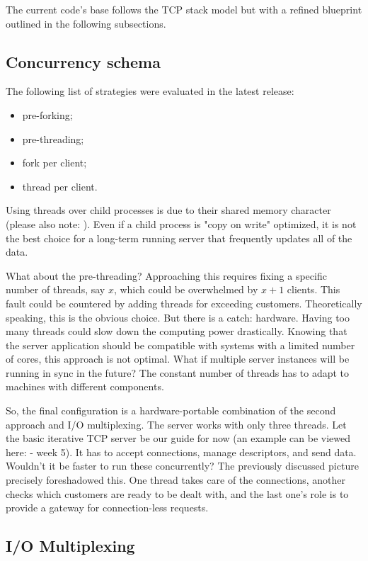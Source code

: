 \documentclass[runningheads]{llncs}
\begin{document}
The current code's base follows the TCP stack model but with a refined blueprint outlined in the following subsections.

\subsection{Concurrency schema}

The following list of strategies were evaluated in the latest release:
\begin{itemize}
  \item pre-forking;
  \item pre-threading;
  \item fork per client;
  \item thread per client.
\end{itemize}

Using threads over child processes is due to their shared memory character (please also note: \cite{fork-vs-thread}). Even if a child process is "copy on write" optimized, it is not the best choice for a long-term running server that frequently updates all of the data. 

What about the pre-threading? Approaching this requires fixing a specific number of threads, say $x$, which could be overwhelmed by $x + 1$ clients. This fault could be countered by adding threads for exceeding customers. Theoretically speaking, this is the obvious choice. But there is a catch: hardware. Having too many threads could slow down the computing power drastically. Knowing that the server application should be compatible with systems with a limited number of cores, this approach is not optimal. What if multiple server instances will be running in sync in the future? The constant number of threads has to adapt to machines with different components.

So, the final configuration is a hardware-portable combination of the second approach and I/O multiplexing. The server works with only three threads. Let the basic iterative TCP server be our guide for now (an example can be viewed here: \cite{course} - week 5). It has to accept connections, manage descriptors, and send data. Wouldn't it be faster to run these concurrently? The previously discussed picture precisely foreshadowed this. One thread takes care of the connections, another checks which customers are ready to be dealt with, and the last one's role is to provide a gateway for connection-less requests.

\subsection{I/O Multiplexing}
\end{document}
